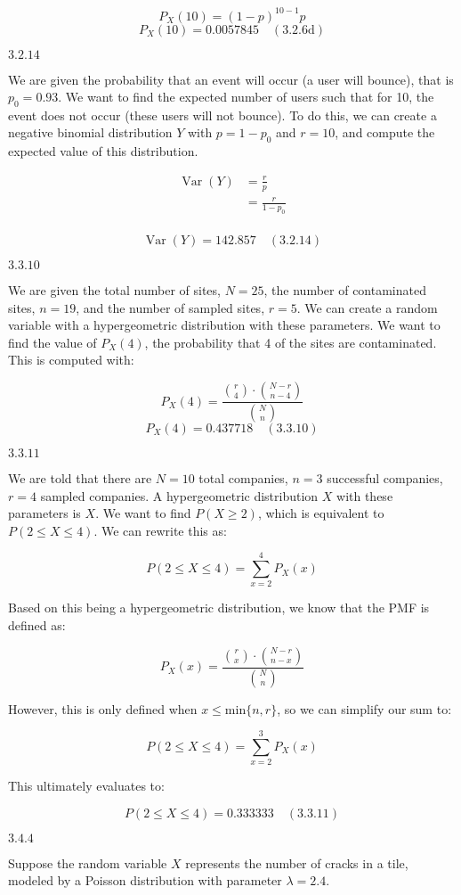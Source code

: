 \documentclass{article}
\newcommand{\problem}[2]{$\boxed{\text{#1.#2}}$}
\newcommand{\solution}[3]{\boxed{#3\quad(\text{#1.#2})}}
\newcommand{\subsolution}[4]{\boxed{#4\quad(\text{#1.#2#3})}}
\newcommand{\multistep}[1]{\begin{array}{rl} #1 \end{array}}
\DeclareMathOperator{\var}{Var}
\begin{document}
\[
P_X(10)=(1-p)^{10-1}p
\] \[
\subsolution{3.2}{6}{d}{P_X(10)=0.0057845}
\]

%
\problem{3.2}{14}

We are given the probability that an event will occur (a user will
bounce), that is $p_0=0.93$. We want to find the expected number of
users such that for 10, the event does not occur (these users will not
bounce). To do this, we can create a negative binomial distribution
$Y$ with $p=1-p_0$ and $r=10$, and compute the expected value of this
distribution.

\[
\multistep{
\var(Y)&=\frac{r}{p} \\
&=\frac{r}{1-p_0} \\
}
\]

\[
\solution{3.2}{14}{\var(Y)=142.857}
\]

%
\problem{3.3}{10}

We are given the total number of sites, $N=25$, the number of
contaminated sites, $n=19$, and the number of sampled sites, $r=5$. We
can create a random variable with a hypergeometric distribution with
these parameters. We want to find the value of $P_X(4)$, the
probability that 4 of the sites are contaminated. This is computed
with:

\[
P_X(4)=\dfrac{\binom{r}{4}\cdot\binom{N-r}{n-4}}{\binom{N}{n}}
\] \[
\solution{3.3}{10}{P_X(4)=0.437718}
\]

%
\problem{3.3}{11}

We are told that there are $N=10$ total companies, $n=3$ successful
companies, $r=4$ sampled companies. A hypergeometric distribution $X$
with these parameters is $X$. We want to find $P(X\ge2)$, which is
equivalent to $P(2\le{}X\le 4)$. We can rewrite this as:

\[
P(2\le X\le 4)=\sum\limits_{x=2}^4 P_X(x)
\]

Based on this being a hypergeometric distribution, we know that the
PMF is defined as:

\[
P_X(x) = \dfrac{\binom{r}{x}\cdot\binom{N-r}{n-x}}{\binom{N}{n}}
\]

However, this is only defined when $x\le{}\text{min}\{n,r\}$, so we
can simplify our sum to:

\[
P(2\le X\le 4)=\sum\limits_{x=2}^3 P_X(x)
\]

This ultimately evaluates to:

\[
\solution{3.3}{11}{P(2\le X\le 4)=0.333333}
\]

%
\problem{3.4}{4}

Suppose the random variable $X$ represents the number of cracks in a
tile, modeled by a Poisson distribution with parameter $\lambda=2.4$.
\end{document}
